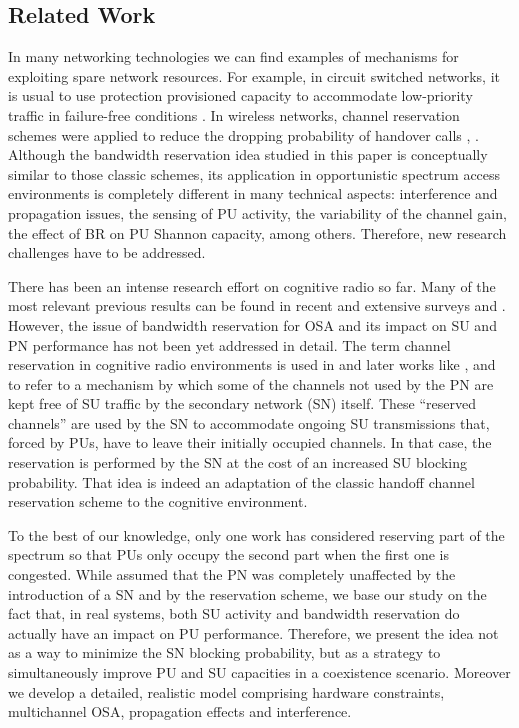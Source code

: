\subsection{Related Work}\label{sec:RelatedWork}
In many networking technologies we can find examples of mechanisms for exploiting spare network resources. For example, in circuit switched networks, it is usual to use protection provisioned capacity to accommodate low-priority traffic in failure-free conditions \cite{ref:CircuitSwitched}.
In wireless networks, channel reservation schemes were applied to reduce the dropping probability of handover calls \cite{ReservationHandoff}, \cite{ReservationHandoff2}. 
Although the bandwidth reservation idea studied in this paper is conceptually similar to those classic schemes, its application in opportunistic spectrum access environments is completely different in many technical aspects: interference and propagation issues, the sensing of PU activity, the variability of the channel gain, the effect of BR on PU Shannon capacity, among others. Therefore, new research challenges have to be addressed.

There has been an intense research effort on cognitive radio so far. Many of the most relevant previous results can be found in recent and extensive surveys \cite{ref:Surveycognitive1} and \cite{ref:Surveycognitive2}.
However, the issue of bandwidth reservation for OSA and its impact on SU and PN performance has not been yet addressed in detail.
The term channel reservation in cognitive radio environments is used in \cite{ref:Reservation} and later works like \cite{ref:Reservation2}, \cite{ref:Reservation3} and \cite{ref:Reservation3b} to refer to a mechanism by which some of the channels not used by the PN are kept free of SU traffic by the secondary network (SN) itself. These ``reserved channels'' are used by the SN to accommodate ongoing SU transmissions that, forced by PUs, have to leave their initially occupied channels. In that case, the reservation is performed by the SN at the cost of an increased SU blocking probability. That idea is indeed an adaptation of the classic handoff channel reservation scheme to the cognitive environment.

To the best of our knowledge, only one work \cite{ref:Reservation4} has considered reserving part of the spectrum so that PUs only occupy the second part when the first one is congested.
While \cite{ref:Reservation4} assumed that the PN was completely unaffected by the introduction of a SN and by the reservation scheme, we base our study on the fact that, in real systems, both SU activity and bandwidth reservation do actually have an impact on PU performance. Therefore, we present the idea not as a way to minimize the SN blocking probability, but as a strategy to simultaneously improve PU and SU capacities in a coexistence scenario. Moreover we develop a detailed, realistic model comprising hardware constraints, multichannel OSA, propagation effects and interference.

